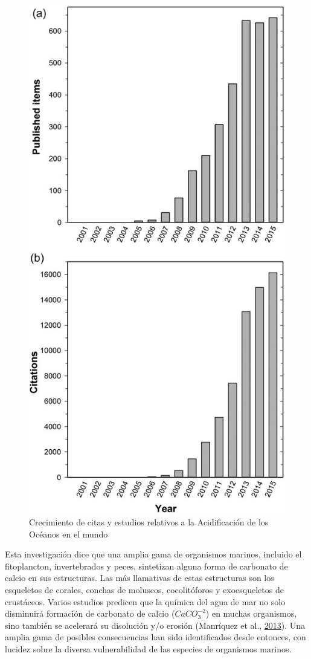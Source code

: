 \documentclass[
]{article}
\begin{document}
\begin{figure}

{\centering \includegraphics[width=0.6\linewidth]{images/Fig1} 

}

\caption{Crecimiento de citas y estudios relativos a la Acidificación de los Océanos en el mundo}\label{fig:unnamed-chunk-1}
\end{figure}

Esta investigación dice que una amplia gama de organismos marinos,
incluido el fitoplancton, invertebrados y peces, sintetizan alguna forma
de carbonato de calcio en sus estructuras. Las más llamativas de estas
estructuras son los esqueletos de corales, conchas de moluscos,
cocolitóforos y exoesqueletos de crustáceos. Varios estudios predicen
que la química del agua de mar no solo disminuirá formación de carbonato
de calcio (\({CaCO}_{3}^{-2}\)) en muchas organismos, sino también se
acelerará su disolución y/o erosión (Manríquez et al.,
\protect\hyperlink{ref-Manriquez2013}{2013}). Una amplia gama de
posibles consecuencias han sido identificados desde entonces, con
lucidez sobre la diversa vulnerabilidad de las especies de organismos
marinos.
\end{document}
